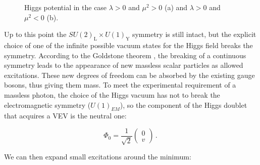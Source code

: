 \begin{figure}[ht]
\centering
{}
\caption{Higgs potential in the case $\lambda > 0$ and $\mu^2 > 0$ (a) and $\lambda > 0$ and $\mu^2 < 0$ (b).}
\label{fig:sm:higgsV}
\end{figure}

Up to this point the $SU(2)_\mathrm{L} \times U(1)_\mathrm{Y}$ symmetry is still intact, but the explicit choice of one of the infinite possible vacuum states for the Higgs field breaks the symmetry. According to the Goldstone theorem \cite{Goldstone:1962es}, the breaking of a continuous symmetry leads to the appearance of new massless scalar particles as allowed excitations. These new degrees of freedom can be absorbed by the existing gauge bosons, thus giving them mass. To meet the experimental requirement of a massless photon, the choice of the Higgs vacuum has not to break the electromagnetic symmetry ($U(1)_{EM}$), so the component of the Higgs doublet that acquires a VEV is the neutral one:

\begin{equation}
	\Phi_0 = \frac{1}{\sqrt{2}} \left( \begin{array}{c} 0 \\ v  \end{array} \right) \, . \
\label{eq:hvphi}
\end{equation}

We can then expand small excitations around the minimum:

